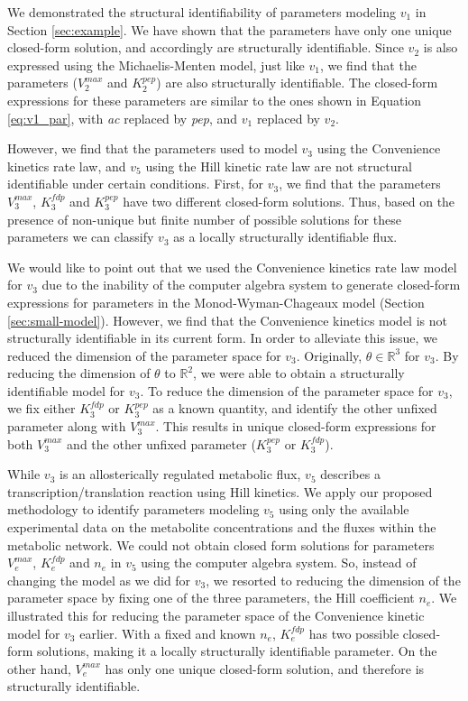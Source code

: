 \documentclass[10pt]{article}
\begin{document}
	We demonstrated the structural identifiability of parameters modeling $v_1$ in Section \ref{sec:example}. We have shown that the parameters have only one unique closed-form solution, and accordingly are structurally identifiable. Since $v_2$ is also expressed using the Michaelis-Menten model, just like $v_1$, we find that the parameters ($V_2^{max}$ and $K_2^{pep}$) are also structurally identifiable. The closed-form expressions for these parameters are similar to the ones shown in Equation \ref{eq:v1_par}, with \textit{ac} replaced by \textit{pep}, and $v_1$ replaced by $v_2$. 
	
	However, we find that the parameters used to model $v_3$ using the Convenience kinetics rate law, and $v_5$ using the Hill kinetic rate law are not structural identifiable under certain conditions. First, for $v_3$, we find that the parameters $V_3^{max}$, $K_3^{fdp}$ and $K_3^{pep}$ have two different closed-form solutions. Thus, based on the presence of non-unique but finite number of possible solutions for these parameters we can classify $v_3$ as a locally structurally identifiable flux. 
	
	We would like to point out that we used the Convenience kinetics rate law model for $v_3$ due to the inability of the computer algebra system to generate closed-form expressions for parameters in the Monod-Wyman-Chageaux model (Section \ref{sec:small-model}). However, we find that the Convenience kinetics model is not structurally identifiable in its current form. In order to alleviate this issue, we reduced the dimension of the parameter space for $v_3$. Originally, $\theta \in \mathbb{R}^3$ for $v_3$. By reducing the dimension of $\theta$ to $\mathbb{R}^2$, we were able to obtain a structurally identifiable model for $v_3$. To reduce the dimension of the parameter space for $v_3$, we fix either $K_3^{fdp}$ or $K_3^{pep}$ as a known quantity, and identify the other unfixed parameter along with $V_3^{max}$. This results in unique closed-form expressions for both $V_3^{max}$ and the other unfixed parameter ($K_3^{pep}$ or $K_3^{fdp}$).
	
	While $v_3$ is an allosterically regulated metabolic flux, $v_5$ describes a transcription/translation reaction using Hill kinetics. We apply our proposed methodology to identify parameters modeling $v_5$ using only the available experimental data on the metabolite concentrations and the fluxes within the metabolic network. We could not obtain closed form solutions for parameters $V_e^{max}$, $K_e^{fdp}$ and $n_e$ in $v_5$ using the computer algebra system. So, instead of changing the model as we did for $v_3$, we resorted to reducing the dimension of the parameter space by fixing one of the three parameters, the Hill coefficient $n_e$. We illustrated this for reducing the parameter space of the Convenience kinetic model for $v_3$ earlier. With a fixed and known $n_e$, $K_e^{fdp}$ has two possible closed-form solutions, making it a locally structurally identifiable parameter. On the other hand, $V_e^{max}$ has only one unique closed-form solution, and therefore is structurally identifiable. 
	
\end{document}
